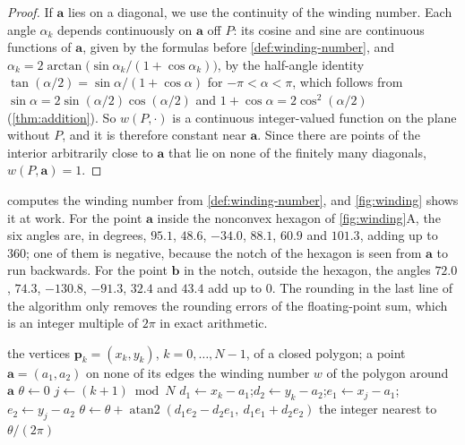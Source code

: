 \begin{proof}
If $\mathbf a$ lies on a diagonal, we use the continuity of the winding number. Each angle $\alpha_k$ depends continuously on $\mathbf a$ off $P$: its cosine and sine are continuous functions of $\mathbf a$, given by the formulas before \cref{def:winding-number}, and $\alpha_k=2\arctan\bigl(\sin\alpha_k/(1+\cos\alpha_k)\bigr)$, by the half-angle identity $\tan(\alpha/2)=\sin\alpha/(1+\cos\alpha)$ for $-\pi<\alpha<\pi$, which follows from $\sin\alpha=2\sin(\alpha/2)\cos(\alpha/2)$ and $1+\cos\alpha=2\cos^2(\alpha/2)$ (\cref{thm:addition}). So $w(P,\cdot)$ is a continuous integer-valued function on the plane without $P$, and it is therefore constant near $\mathbf a$. Since there are points of the interior arbitrarily close to $\mathbf a$ that lie on none of the finitely many diagonals, $w(P,\mathbf a)=1$.
\end{proof}

 computes the winding number from \cref{def:winding-number}, and \cref{fig:winding} shows it at work. For the point $\mathbf a$ inside the nonconvex hexagon of \cref{fig:winding}A, the six angles are, in degrees, $95.1$, $48.6$, $-34.0$, $88.1$, $60.9$ and $101.3$, adding up to $360$; one of them is negative, because the notch of the hexagon is seen from $\mathbf a$ to run backwards. For the point $\mathbf b$ in the notch, outside the hexagon, the angles $72.0$, $74.3$, $-130.8$, $-91.3$, $32.4$ and $43.4$ add up to $0$. The rounding in the last line of the algorithm only removes the rounding errors of the floating-point sum, which is an integer multiple of $2\pi$ in exact arithmetic.

\begin{algorithm}
\begin{algorithmic}[1]
\Require the vertices $\mathbf p_k=(x_k,y_k)$, $k=0,\ldots,N-1$, of a closed polygon; a point $\mathbf a=(a_1,a_2)$ on none of its edges
\Ensure the winding number $w$ of the polygon around $\mathbf a$
\State $\theta\gets0$
  \State $j\gets(k+1)\bmod N$
  \State $d_1\gets x_k-a_1$;\quad $d_2\gets y_k-a_2$;\quad $e_1\gets x_j-a_1$;\quad $e_2\gets y_j-a_2$
  \State $\theta\gets\theta+\operatorname{atan2}(d_1e_2-d_2e_1,\ d_1e_1+d_2e_2)$ 
\EndFor
\State \Return the integer nearest to $\theta/(2\pi)$
\end{algorithmic}
\caption{The winding number of a closed polygon around a point, as the sum of the angles under which its edges are seen (\cref{def:winding-number}). By \cref{thm:point-in-polygon}, for a simple polygon in counterclockwise order the result is $1$ for points inside and $0$ for points outside. The cost is $N$ evaluations of $\operatorname{atan2}$.}
\label{alg:winding}
\end{algorithm}

